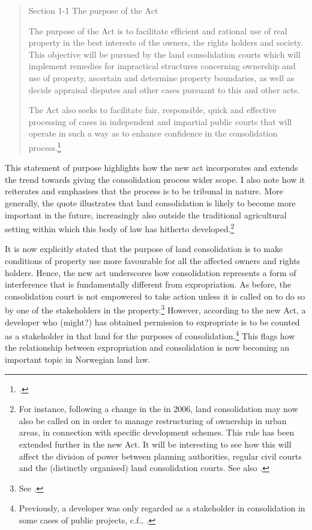 \begin{quote}
Section 1-1 The purpose of the Act

The purpose of the Act is to facilitate efficient and rational use of real property in the best interests of the owners, the rights holders and society. This objective will be pursued by the land consolidation courts which will implement remedies for impractical structures concerning ownership and use of property, ascertain and determine property boundaries, as well as decide appraisal disputes and other cases pursuant to this and other acts.

The Act also seeks to facilitate fair, responsible, quick and effective processing of cases in independent and impartial public courts that will operate in such a way as to enhance confidence in the consolidation process.\footcite[1]{lca13}
\end{quote}

This statement of purpose highlights how the new act incorporates and extends the trend towards giving the consolidation process wider scope. I also note how it reiterates and emphasises that the process is to be tribunal in nature. More generally, the quote illustrates that land consolidation is likely to become more important in the future, increasingly also outside the traditional agricultural setting within which this body of law has hitherto developed.\footnote{For instance, following a change in the \cite{lca79} in 2006, land consolidation may now also be called on in order to manage restructuring of ownership in urban areas, in connection with specific development schemes. This rule has been extended further in the new Act. It will be interesting to see how this will affect the division of power between planning authorities, regular civil courts and the (distinctly organised) land consolidation courts. See also \cite{stenseth07}.}

It is now explicitly stated that the purpose of land consolidation is to make conditions of property use more favourable for all the affected owners and rights holders. Hence, the new act underscores how consolidation represents a form of interference that is fundamentally different from expropriation. As before, the consolidation court is not empowered to take action unless it is called on to do so by one of the stakeholders in the property.\footnote{See \cite[1-5]{lca13}.} However, according to the new Act, a developer who (might?) has obtained permission to expropriate is to be counted as a stakeholder in that land for the purposes of consolidation.\footnote{Previously, a developer was only regarded as a stakeholder in consolidation in some cases of public projects, c.f., \cite[5|88|88 a)]{lca79}.} This flags how the relationship between expropriation and consolidation is now becoming an important topic in Norwegian land law.

